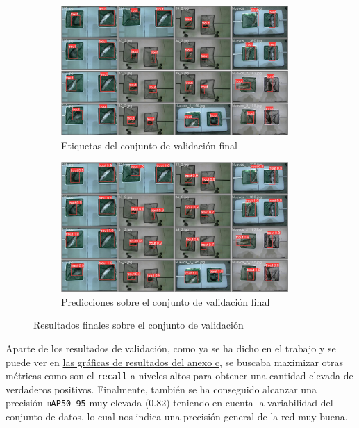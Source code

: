\begin{figure}[H]
    \centering
    \begin{subfigure}[b]{0.7\textwidth}
        \centering
        \includegraphics[width=0.95\textwidth]{images/7/labels.jpg}
        \caption{Etiquetas del conjunto de validación final}
    \end{subfigure}
    \begin{subfigure}[b]{0.7\textwidth}
        \centering
        \includegraphics[width=0.95\textwidth]{images/7/pred.jpg}
        \caption{Predicciones sobre el conjunto de validación final}
    \end{subfigure}
    \caption{Resultados finales sobre el conjunto de validación}
    \label{fig:ValidacionRed}
\end{figure}

Aparte de los resultados de validación, como ya se ha dicho en el trabajo y se puede ver en \hyperref[train:final]{las gráficas de resultados del anexo c}, se buscaba maximizar otras métricas como son 
el \texttt{recall} a niveles altos para obtener una cantidad elevada de verdaderos 
positivos. Finalmente, también se ha conseguido alcanzar una precisión \texttt{mAP50-95} muy elevada (0.82) teniendo en cuenta la variabilidad del conjunto de datos, lo cual nos indica una precisión 
general de la red muy buena.

